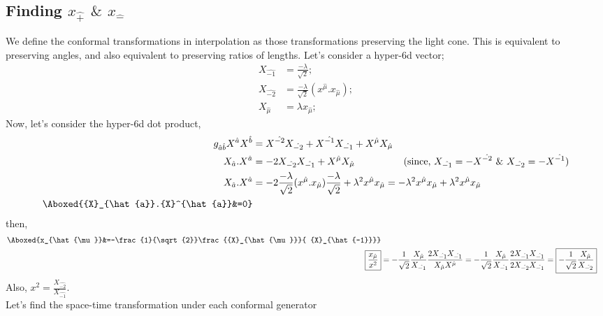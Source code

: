 \documentclass[]{article}
\numberwithin{equation}{section}
\begin{document}
{{\subsection{Finding $x_{\hat{+}}$ $\&$ $x_{\hat{-}}$}
We define the conformal transformations in interpolation as those transformations preserving the light cone. This is equivalent to preserving angles, and also equivalent to preserving ratios of lengths. Let's consider a hyper-6d vector;
\begin{align}
    {X}_{\hat{-1}}&=\frac{-\lambda}{\sqrt{2}};\\
    {X}_{\hat{-2}}&=\frac{-\lambda}{\sqrt{2}}(x^{\hat{\mu}}.x_{\hat{\mu}});\\
     {X}_{\hat{\mu}}&=\lambda x_{\hat{\mu}};
\end{align}
Now, let's consider the hyper-6d dot product,
\begin{align}
    g_{\hat{a}\hat{b}}{X}^{\hat{a}} {X}^{\hat{b}}&={X}^{\hat{-2}}{X}_{\hat{-2}}+{X}^{\hat{-1}}{X}_{\hat{-1}}+{X}^{\hat{\mu}}{X}_{\hat{\mu}}\\
    {X}_{\hat{a}}.{X}^{\hat{a}}&=-2{X}_{\hat{-2}}{X}_{\hat{-1}}+{X}^{\hat{\mu}}{X}_{\hat{\mu}}~~~~~~~~~~~~~~~(\text{since, }{X}_{\hat{-1}}=-{X}^{\hat{-2}}~\&~{X}_{\hat{-2}}=-{X}^{\hat{-1}})\\
     {X}_{\hat{a}}.{X}^{\hat{a}}&=-2\frac{-\lambda}{\sqrt{2}}(x^{\hat{\mu}}.x_{\hat{\mu}})\frac{-\lambda}{\sqrt{2}}+\lambda^2{x}^{\hat{\mu}}{x}_{\hat{\mu}}=-\lambda^2{x}^{\hat{\mu}}{x}_{\hat{\mu}}+\lambda^2{x}^{\hat{\mu}}{x}_{\hat{\mu}}\\
      \Aboxed{{X}_{\hat{a}}.{X}^{\hat{a}}&=0}
\end{align}
then,
\begin{align}
     \Aboxed{x_{\hat{\mu}}&=-\frac{1}{\sqrt{2}}\frac{{X}_{\hat{\mu}}}{ {X}_{\hat{-1}}}}\\
     \boxed{\frac{x_{\hat{\mu}}}{x^2}}&=-\frac{1}{\sqrt{2}}\frac{{X}_{\hat{\mu}}}{{X}_{\hat{-1}}}\frac{2{X}_{\hat{-1}}{X}_{\hat{-1}}}{{X}_{\hat{\mu}}{X}^{\hat{\mu}}}=-\frac{1}{\sqrt{2}}\frac{{X}_{\hat{\mu}}}{{X}_{\hat{-1}}}\frac{2{X}_{\hat{-1}}{X}_{\hat{-1}}}{2{X}_{\hat{-2}}{X}_{\hat{-1}}}=\boxed{-\frac{1}{\sqrt{2}}\frac{{X}_{\hat{\mu}}}{{X}_{\hat{-2}}}}
\end{align}
Also, $\boxed{x^2=\frac{{X}_{\hat{-2}}}{{X}_{\hat{-1}}}}$.\\
Let's find the space-time transformation under each conformal generator
}}
\end{document}
